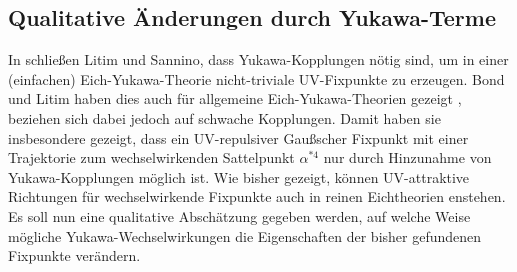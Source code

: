     
  \subsection{Qualitative Änderungen durch Yukawa-Terme}
    
    In \cite{Asymptotic_safety_guaranteed} schließen Litim und Sannino, dass 
    Yukawa-Kopplungen nötig sind, um in einer (einfachen) Eich-Yukawa-Theorie 
    nicht-triviale UV-Fixpunkte zu erzeugen. Bond und Litim haben 
    dies auch für allgemeine Eich-Yukawa-Theorien gezeigt \cite{Bond_Litim}, 
    beziehen sich dabei jedoch auf schwache Kopplungen. Damit haben sie 
    insbesondere gezeigt, dass ein UV-repulsiver Gaußscher Fixpunkt mit 
    einer Trajektorie zum wechselwirkenden Sattelpunkt $\alpha^{*4}$ nur durch 
    Hinzunahme von Yukawa-Kopplungen möglich ist. Wie bisher gezeigt, können 
    UV-attraktive Richtungen für wechselwirkende Fixpunkte auch in 
    reinen Eichtheorien enstehen. Es soll nun eine qualitative Abschätzung 
    gegeben werden, auf welche Weise mögliche Yukawa-Wechselwirkungen die 
    Eigenschaften der bisher gefundenen Fixpunkte verändern.
    

